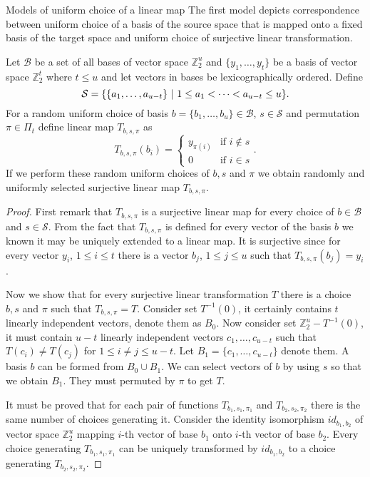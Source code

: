 \begin{section}{Models of uniform choice of a linear map}
The first model depicts correspondence between uniform choice of a basis of the source space that is mapped onto a fixed basis of the target space and uniform choice of surjective linear transformation.
\begin{remark}
\label{remark-model-surjective-linear-map-selection}
Let $\mathcal{B}$ be a set of all bases of vector space $\mathbb{Z}_2^u$ and $\{y_1, \dots, y_t\}$ be a basis of vector space $\mathbb{Z}_2^t$ where $t \leq u$ and let vectors in bases be lexicographically ordered. Define \[\mathcal{S} = \{\{a_1, \dots, a_{u - t}\} \ | \  1 \leq a_1 < \dots < a_{u-t} \leq u \} \text{.} \] For a random uniform choice of basis $b = \{b_1, \dots, b_u\} \in \mathcal{B}$, $s \in \mathcal{S}$ and permutation $\pi \in \Pi_t$ define linear map $T_{b, s, \pi}$ as
\[
T_{b, s, \pi}(b_i) =  
  \begin{cases} 
    y_{\pi(i)} & \text{if } i \notin s \\
    0 & \text{if } i \in s
  \end{cases} \text{.}
\]
If we perform these random uniform choices of $b, s$ and $\pi$ we obtain randomly and uniformly selected surjective linear map $T_{b, s, \pi}$.
\end{remark}
\begin{proof}
First remark that $T_{b, s, \pi}$ is a surjective linear map for every choice of $b \in \mathcal{B}$ and $s \in \mathcal{S}$. From the fact that $T_{b, s, \pi}$ is defined for every vector of the basis $b$ we known it may be uniquely extended to a linear map. It is surjective since for every vector $y_i$, $1 \leq i \leq t$ there is a vector $b_j$, $1 \leq j \leq u$ such that $T_{b, s, \pi}(b_j) = y_i$. 

Now we show that for every surjective linear transformation $T$ there is a choice $b, s$ and $\pi$ such that $T_{b, s, \pi} = T$. Consider set $T^{-1}(0)$, it certainly contains $t$ linearly independent vectors, denote them as $B_0$. Now consider set $\mathbb{Z}_2^u - T^{-1}(0)$, it must contain $u - t$ linearly independent vectors $c_1, \dots, c_{u-t}$ such that $T(c_i) \neq T(c_j)$ for $1 \leq i \neq j \leq u - t$. Let $B_1 = \{c_1, \dots, c_{u - t}\}$ denote them. A basis $b$ can be formed from $B_0 \cup B_1$. We can select vectors of $b$ by using $s$ so that we obtain $B_1$. They must permuted by $\pi$ to get $T$. 

It must be proved that for each pair of functions $T_{b_1, s_1, \pi_1}$ and $T_{b_2, s_2, \pi_2}$ there is the same number of choices generating it. Consider the identity isomorphism $id_{b_1, b_2}$ of vector space $\mathbb{Z}_2^u$ mapping $i$-th vector of base $b_1$ onto $i$-th vector of base $b_2$. Every choice generating $T_{b_1, s_1, \pi_1}$ can be uniquely transformed by $id_{b_1, b_2}$ to a choice generating $T_{b_2, s_2, \pi_2}$.
\end{proof}


\end{section}
